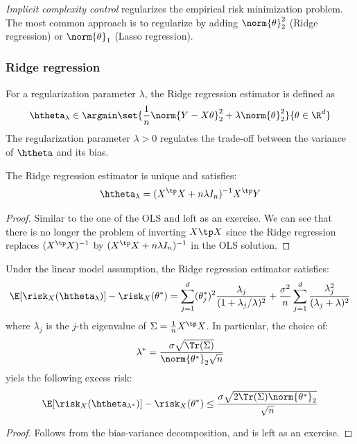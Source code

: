 \documentclass[toc, titlepaged]{../cs-classes/cs-classes}
\begin{document}
\emph{Implicit complexity control} regularizes the empirical risk minimization problem. The most common approach is to regularize by adding $\norm{\theta}^2_2$ (Ridge regression) or $\norm{\theta}_1$ (Lasso regression).

\subsubsection{Ridge regression}
\begin{definition}
    For a regularization parameter $\lambda$, the Ridge regression estimator is defined as
    \begin{equation}
        \htheta_\lambda \in \argmin\set{\frac{1}{n}\norm{Y-X\theta}^2_2+\lambda\norm{\theta}^2_2}{\theta\in\R^d}
    \end{equation}
    The regularization parameter $\lambda>0$ regulates the trade-off between the variance of $\htheta$ and its bias.
\end{definition}

\begin{property}
    The Ridge regression estimator is unique and satisfies:
    \begin{equation*}
        \htheta_\lambda = (X^\tp X+n\lambda I_n)^{-1}X^\tp Y
    \end{equation*}
\end{property}
\begin{proof}
    Similar to the one of the OLS and left as an exercise. We can see that there is no longer the problem of inverting $X\tp X$ since the Ridge regression replaces $(X^\tp X)^{-1}$ by $(X^\tp X+n\lambda I_n)^{-1}$ in the OLS solution.
\end{proof}

\begin{property}
    Under the linear model assumption, the Ridge regression estimator satisfies:
    \begin{equation*}
        \E[\risk_X(\htheta_\lambda)]-\risk_X(\theta^*) = \sum_{j=1}^d(\theta_j^*)^2\frac{\lambda_j}{(1+\lambda_j/\lambda)^2} + \frac{\sigma^2}{n}\sum_{j=1}^d\frac{\lambda_j^2}{(\lambda_j+\lambda)^2}
    \end{equation*}
    where $\lambda_j$ is the $j$-th eigenvalue of $\Sigma=\frac{1}{n}X^\tp X$. In particular, the choice of:
    \begin{equation*}
        \lambda^* = \frac{\sigma\sqrt{\Tr(\Sigma)}}{\norm{\theta^*}_2\sqrt{n}}
    \end{equation*}
    yiels the following excess risk:
    \begin{equation*}
        \E[\risk_X(\htheta_{\lambda^*})]-\risk_X(\theta^*) \leq \frac{\sigma\sqrt{2\Tr(\Sigma)\norm{\theta^*}_2}}{\sqrt{n}}
    \end{equation*}
\end{property}
\begin{proof}
    Follows from the bias-variance decomposition, and is left as an exercise.
\end{proof}
\end{document}
